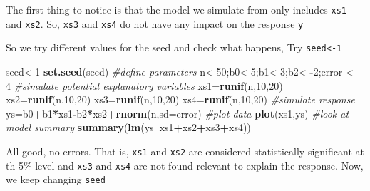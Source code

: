\documentclass[
]{book}
\newenvironment{Shaded}{\begin{snugshade}}{\end{snugshade}}
\newcommand{\CommentTok}[1]{\textcolor[rgb]{0.56,0.35,0.01}{\textit{#1}}}
\newcommand{\DataTypeTok}[1]{\textcolor[rgb]{0.13,0.29,0.53}{#1}}
\newcommand{\DecValTok}[1]{\textcolor[rgb]{0.00,0.00,0.81}{#1}}
\newcommand{\KeywordTok}[1]{\textcolor[rgb]{0.13,0.29,0.53}{\textbf{#1}}}
\newcommand{\NormalTok}[1]{#1}
\newcommand{\OperatorTok}[1]{\textcolor[rgb]{0.81,0.36,0.00}{\textbf{#1}}}
\newcommand{\StringTok}[1]{\textcolor[rgb]{0.31,0.60,0.02}{#1}}
\begin{document}
The first thing to notice is that the model we simulate from only includes \texttt{xs1} and \texttt{xs2}. So, \texttt{xs3} and \texttt{xs4} do not have any impact on the response \texttt{y}

So we try different values for the seed and check what happens, Try \texttt{seed\textless{}-1}

\begin{Shaded}
\begin{Highlighting}[]
\NormalTok{seed<-}\DecValTok{1}
\KeywordTok{set.seed}\NormalTok{(seed)}
\CommentTok{#define parameters}
\NormalTok{n<-}\DecValTok{50}\NormalTok{;b0<-}\DecValTok{5}\NormalTok{;b1<-}\DecValTok{3}\NormalTok{;b2<-}\OperatorTok{-}\DecValTok{2}\NormalTok{;error <-}\StringTok{ }\DecValTok{4}
\CommentTok{#simulate potential explanatory variables}
\NormalTok{xs1=}\KeywordTok{runif}\NormalTok{(n,}\DecValTok{10}\NormalTok{,}\DecValTok{20}\NormalTok{)}
\NormalTok{xs2=}\KeywordTok{runif}\NormalTok{(n,}\DecValTok{10}\NormalTok{,}\DecValTok{20}\NormalTok{)}
\NormalTok{xs3=}\KeywordTok{runif}\NormalTok{(n,}\DecValTok{10}\NormalTok{,}\DecValTok{20}\NormalTok{)}
\NormalTok{xs4=}\KeywordTok{runif}\NormalTok{(n,}\DecValTok{10}\NormalTok{,}\DecValTok{20}\NormalTok{)}
\CommentTok{#simulate response}
\NormalTok{ys=b0}\OperatorTok{+}\NormalTok{b1}\OperatorTok{*}\NormalTok{xs1}\OperatorTok{-}\NormalTok{b2}\OperatorTok{*}\NormalTok{xs2}\OperatorTok{+}\KeywordTok{rnorm}\NormalTok{(n,}\DataTypeTok{sd=}\NormalTok{error)}
\CommentTok{#plot data}
\KeywordTok{plot}\NormalTok{(xs1,ys)}
\CommentTok{#look at model summary}
\KeywordTok{summary}\NormalTok{(}\KeywordTok{lm}\NormalTok{(ys}\OperatorTok{~}\NormalTok{xs1}\OperatorTok{+}\NormalTok{xs2}\OperatorTok{+}\NormalTok{xs3}\OperatorTok{+}\NormalTok{xs4))}
\end{Highlighting}
\end{Shaded}

All good, no errors. That is, \texttt{xs1} and \texttt{xs2} are considered statistically significant at th 5\% level and \texttt{xs3} and \texttt{xs4} are not found relevant to explain the response. Now, we keep changing \texttt{seed}
\end{document}
